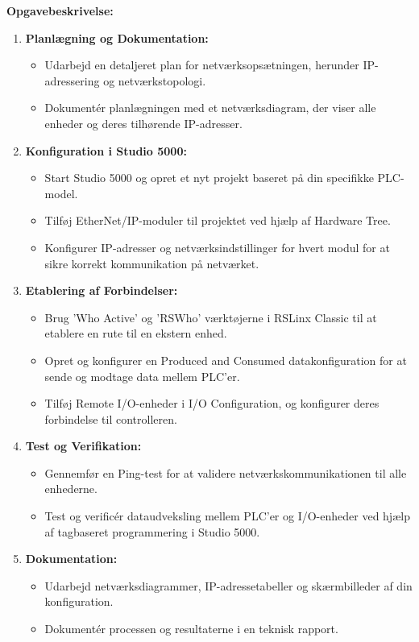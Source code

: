 \noindent\textbf{Opgavebeskrivelse:}
\begin{enumerate}
	\item \textbf{Planlægning og Dokumentation:}
	\begin{itemize}
		\item Udarbejd en detaljeret plan for netværksopsætningen, herunder IP-adressering og netværkstopologi.
		\item Dokumentér planlægningen med et netværksdiagram, der viser alle enheder og deres tilhørende IP-adresser.
	\end{itemize}
	
	\item \textbf{Konfiguration i Studio 5000:}
	\begin{itemize}
		\item Start Studio 5000 og opret et nyt projekt baseret på din specifikke PLC-model.
		\item Tilføj EtherNet/IP-moduler til projektet ved hjælp af Hardware Tree.
		\item Konfigurer IP-adresser og netværksindstillinger for hvert modul for at sikre korrekt kommunikation på netværket.
	\end{itemize}
	
	\item \textbf{Etablering af Forbindelser:}
	\begin{itemize}
		\item Brug 'Who Active' og 'RSWho' værktøjerne i RSLinx Classic til at etablere en rute til en ekstern enhed.
		\item Opret og konfigurer en Produced and Consumed datakonfiguration for at sende og modtage data mellem PLC'er.
		\item Tilføj Remote I/O-enheder i I/O Configuration, og konfigurer deres forbindelse til controlleren.
	\end{itemize}
	
	\item \textbf{Test og Verifikation:}
	\begin{itemize}
		\item Gennemfør en Ping-test for at validere netværkskommunikationen til alle enhederne.
		\item Test og verificér dataudveksling mellem PLC'er og I/O-enheder ved hjælp af tagbaseret programmering i Studio 5000.
	\end{itemize}
	
	\item \textbf{Dokumentation:}
	\begin{itemize}
		\item Udarbejd netværksdiagrammer, IP-adressetabeller og skærmbilleder af din konfiguration.
		\item Dokumentér processen og resultaterne i en teknisk rapport.
	\end{itemize}
\end{enumerate}


